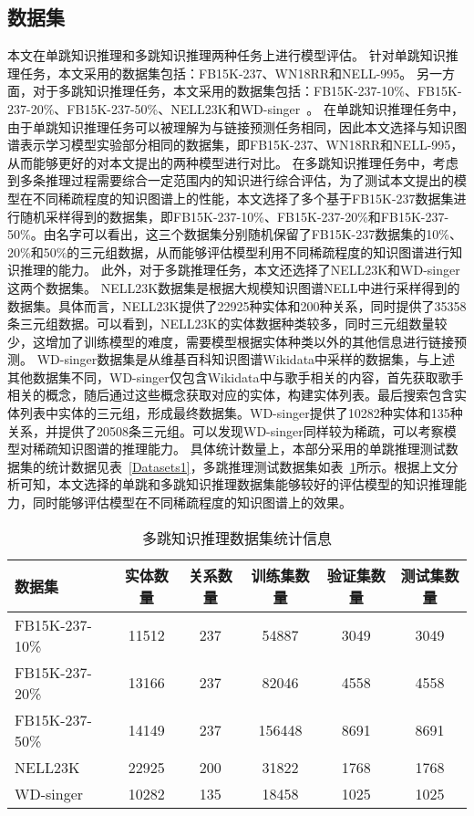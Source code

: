 \documentclass[algorithmlist, AutoFakeBold, AutoFakeSlant, figurelist, tablelist, nomlist, masters]{seuthesix}
\begin{document}
\subsection{数据集}
本文在单跳知识推理和多跳知识推理两种任务上进行模型评估。
针对单跳知识推理任务，本文采用的数据集包括：FB15K-237、WN18RR和NELL-995。
另一方面，对于多跳知识推理任务，本文采用的数据集包括：FB15K-237-10\%、FB15K-237-20\%、FB15K-237-50\%、NELL23K和WD-singer~\cite{lv2020dynamic}。
在单跳知识推理任务中，由于单跳知识推理任务可以被理解为与链接预测任务相同，因此本文选择与知识图谱表示学习模型实验部分相同的数据集，即FB15K-237、WN18RR和NELL-995，从而能够更好的对本文提出的两种模型进行对比。
在多跳知识推理任务中，考虑到多条推理过程需要综合一定范围内的知识进行综合评估，为了测试本文提出的模型在不同稀疏程度的知识图谱上的性能，本文选择了多个基于FB15K-237数据集进行随机采样得到的数据集，即FB15K-237-10\%、FB15K-237-20\%和FB15K-237-50\%。由名字可以看出，这三个数据集分别随机保留了FB15K-237数据集的10\%、20\%和50\%的三元组数据，从而能够评估模型利用不同稀疏程度的知识图谱进行知识推理的能力。
此外，对于多跳推理任务，本文还选择了NELL23K和WD-singer这两个数据集。
NELL23K数据集是根据大规模知识图谱NELL中进行采样得到的数据集。具体而言，NELL23K提供了22925种实体和200种关系，同时提供了35358条三元组数据。可以看到，NELL23K的实体数据种类较多，同时三元组数量较少，这增加了训练模型的难度，需要模型根据实体种类以外的其他信息进行链接预测。
WD-singer数据集是从维基百科知识图谱Wikidata中采样的数据集，与上述其他数据集不同，WD-singer仅包含Wikidata中与歌手相关的内容，首先获取歌手相关的概念，随后通过这些概念获取对应的实体，构建实体列表。最后搜索包含实体列表中实体的三元组，形成最终数据集。WD-singer提供了10282种实体和135种关系，并提供了20508条三元组。可以发现WD-singer同样较为稀疏，可以考察模型对稀疏知识图谱的推理能力。
具体统计数量上，本部分采用的单跳推理测试数据集的统计数据见表~\ref{Datasets1}，多跳推理测试数据集如表~\ref{Datasets2}所示。根据上文分析可知，本文选择的单跳和多跳知识推理数据集能够较好的评估模型的知识推理能力，同时能够评估模型在不同稀疏程度的知识图谱上的效果。

\begin{table}
  \centering
  \begin{tabular*}{0.95\textwidth}{@{\extracolsep{\fill}}lccccc}
		\toprule[1pt]
    数据集 & 实体数量 & 关系数量 & 训练集数量 & 验证集数量 & 测试集数量 \\ \hline
    FB15K-237-10\% & 11512 & 237 & 54887 & 3049 & 3049\\
    FB15K-237-20\% & 13166 & 237 & 82046 & 4558 & 4558\\
    FB15K-237-50\% & 14149 & 237 & 156448 & 8691 & 8691\\
    NELL23K & 22925 & 200 & 31822 & 1768 & 1768\\
    WD-singer & 10282 & 135 & 18458 & 1025 & 1025\\
		\bottomrule[1pt]
	\end{tabular*}
  \caption{多跳知识推理数据集统计信息}
  \label{Datasets2}
\end{table}
\end{document}
